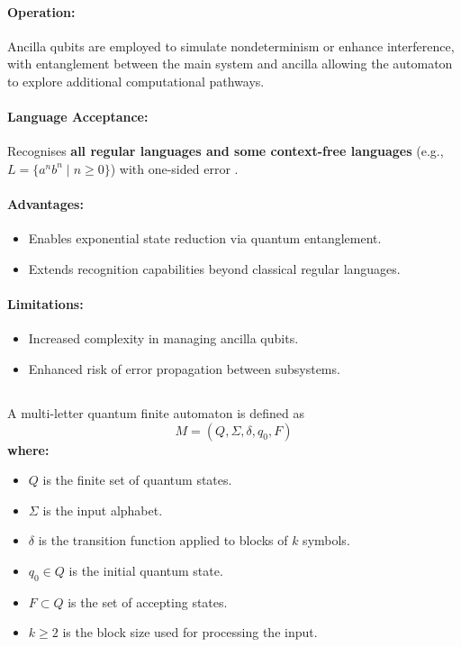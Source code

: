 \paragraph{Operation:}  
Ancilla qubits are employed to simulate nondeterminism or enhance interference, with entanglement between the main system and ancilla allowing the automaton to explore additional computational pathways.

\paragraph{Language Acceptance:}  
Recognises \textbf{all regular languages and some context-free languages} (e.g., \( L = \{a^n b^n \mid n \geq 0\} \)) with one-sided error \cite{yakaryilmaz2011}.

\paragraph{Advantages:}
\begin{itemize}
    \item Enables exponential state reduction via quantum entanglement.
    \item Extends recognition capabilities beyond classical regular languages.
\end{itemize}

\paragraph{Limitations:}
\begin{itemize}
    \item Increased complexity in managing ancilla qubits.
    \item Enhanced risk of error propagation between subsystems.
\end{itemize}

\subsection{}
\label{subsec:ml-qfa}
\begin{definition}
A multi-letter quantum finite automaton is defined as 
\[
M = (Q, \Sigma, \delta, q_0, F)
\]
\textbf{where:}
\begin{itemize}
    \item \( Q \) is the finite set of quantum states.
    \item \( \Sigma \) is the input alphabet.
    \item \( \delta \) is the transition function applied to blocks of \( k \) symbols.
    \item \( q_0 \in Q \) is the initial quantum state.
    \item \( F \subset Q \) is the set of accepting states.
    \item \( k \geq 2 \) is the block size used for processing the input.
\end{itemize}
\end{definition}


